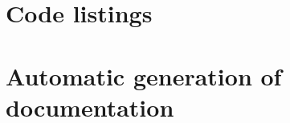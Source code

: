 \documentclass[conference]{IEEEtran}
\begin{document}




\clearpage
\onecolumn
\appendices
\section{Code listings}

\lstlistoflistings
\label{listing:youtube}
\label{listing:sentiment_analysis}
\label{listing:webserve}
\label{listing:models}
\label{listing:database}
\label{listing:test_flask}
\label{listing:test_youtube}
\label{listing:test_sentiment_analysis}
\label{listing:test_codeformat}

\newpage
\section{Automatic generation of documentation}
\end{document}
